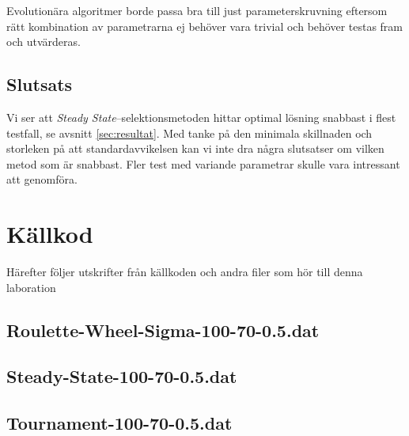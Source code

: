 \documentclass[titlepage, a4paper, 12pt]{article}
\begin{document}
Evolutionära algoritmer borde passa bra till just parameterskruvning
eftersom rätt kombination av parametrarna ej behöver vara trivial och
behöver testas fram och utvärderas.

\subsection{Slutsats}
Vi ser att \textit{Steady State}–selektionsmetoden hittar optimal
lösning snabbast i flest testfall, se avsnitt \ref{sec:resultat}.  Med
tanke på den minimala skillnaden och storleken på att
standardavvikelsen kan vi inte dra några slutsatser om vilken metod
som är snabbast. Fler test med variande parametrar skulle vara
intressant att genomföra.




\newpage
\appendix
{}
\section{Källkod}\label{sec:kallkod}
Härefter följer utskrifter från källkoden och andra filer som hör till
denna laboration

\subsection{Roulette-Wheel-Sigma-100-70-0.5.dat}\label{Roulette-Wheel-Sigma-100-70-0.5.dat}
\begin{footnotesize}
  
\end{footnotesize}

\subsection{Steady-State-100-70-0.5.dat}\label{Steady-State-100-70-0.5.dat}
\begin{footnotesize}
  
\end{footnotesize}

\subsection{Tournament-100-70-0.5.dat}\label{Tournament-100-70-0.5.dat}
\begin{footnotesize}
  
\end{footnotesize}
\end{document}
